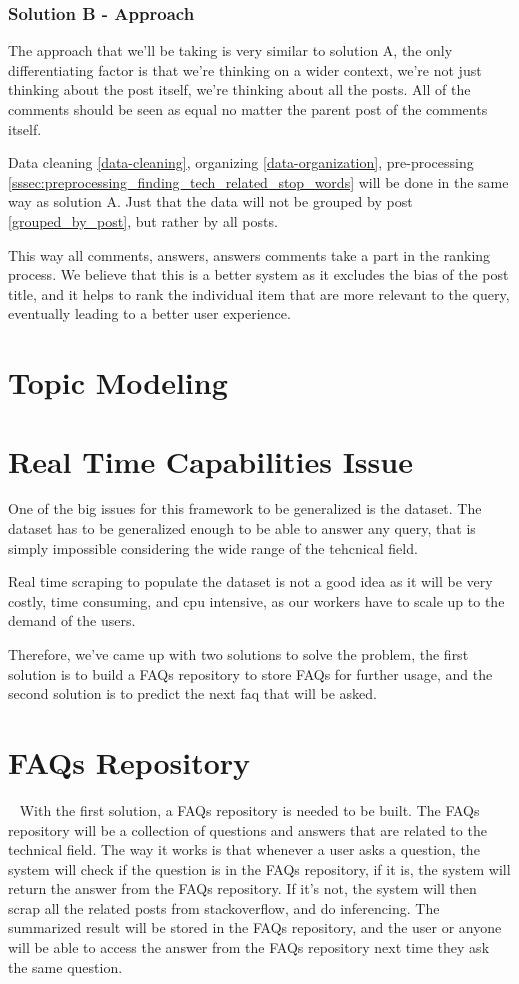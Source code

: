 \subsubsection{Solution B - Approach}
The approach that we'll be taking is very similar to solution A, the only differentiating factor is that we're thinking on a wider context, we're not just thinking about the post itself, we're thinking about all the posts. All of the comments should be seen as equal no matter the parent post of the comments itself. 

Data cleaning \ref{data-cleaning}, organizing \ref*{data-organization}, pre-processing \ref*{sssec:preprocessing_finding_tech_related_stop_words} will be done in the same way as solution A.  Just that the data will not be grouped by post \ref*{grouped_by_post}, but rather by all posts. 

This way all comments, answers, answers comments take a part in the ranking process. We believe that this is a better system as it excludes the bias of the post title, and it helps to rank the individual item that are more relevant to the query, eventually leading to a better user experience.

\section{Topic Modeling}


\section{Real Time Capabilities Issue} \label{real-time-capabilities}
One of the big issues for this framework to be generalized is the dataset. The dataset has to be generalized enough to be able to answer any query, that is simply impossible considering the wide range of the tehcnical field.

Real time scraping to populate the dataset is not a good idea as it will be very costly, time consuming, and cpu intensive, as our workers have to scale up to the demand of the users. 

Therefore, we've came up with two solutions to solve the problem, the first solution is to build a FAQs repository to store FAQs for further usage, and the second solution is to predict the next faq that will be asked.

\pagebreak
\section{FAQs Repository}~\label{faq-repo}
With the first solution, a FAQs repository is needed to be built. The FAQs repository will be a collection of questions and answers that are related to the technical field. The way it works is that whenever a user asks a question, the system will check if the question is in the FAQs repository, if it is, the system will return the answer from the FAQs repository. If it's not, the system will then scrap all the related posts from stackoverflow, and do inferencing. The summarized result will be stored in the FAQs repository, and the user or anyone will be able to access the answer from the FAQs repository next time they ask the same question.

